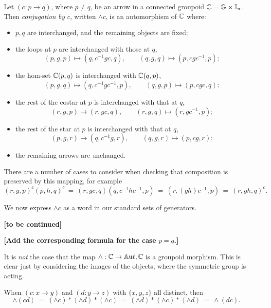 \begin{defn}
Let $(c : p \to q)$, where $p \neq q$, 
be an arrow in a connected groupoid $\mathbb{C} = \mathbb{G} \times \mathbb{I}_n$. 
Then \emph{conjugation by $c$}, written $\wedge c$, 
is an automorphism of $\mathbb{C}$ where: 
\begin{itemize}
\item
$p,q$ are interchanged, and the remaining objects are fixed; 
\item
the loops at $p$ are interchanged with those at $q$, 
$$
(p,g,p) \mapsto (q,c^{-1}gc,q), \qquad 
(q,g,q) \mapsto (p,cgc^{-1},p); 
$$
\item
the hom-set $\mathbb{C}(p,q)$ is interchanged with $\mathbb{C}(q,p)$, 
$$
(p,g,q) \mapsto (q,c^{-1}gc^{-1},p), \qquad 
(q,g,p) \mapsto (p,cgc,q);
$$
\item
the rest of the costar at $p$ is interchanged with that at $q$, 
$$
(r,g,p) \mapsto (r,gc,q), \qquad 
(r,g,q) \mapsto (r,gc^{-1},p);
$$
\item
the rest of the star at $p$ is interchanged with that at $q$, 
$$
(p,g,r) \mapsto (q,c^{-1}g,r), \qquad 
(q,g,r) \mapsto (p,cg,r);
$$
\item
the remaining arrows are unchanged. 
\end{itemize}
\end{defn}
There are a number of cases to consider when checking that composition 
is preserved by this mapping, for example 
$$
(r,g,p)^c(p,h,q)^c 
~=~ (r,gc,q)(q,c^{-1}hc^{-1},p) 
~=~ (r,(gh)c^{-1},p) 
~=~ (r,gh,q)^c. 
$$

\bigskip 
We now express $\wedge c$ as a word in our standard sets of generators. 

\medskip\noindent
{\bf [to be continued]}

\newpage\noindent
{\bf [Add the corresponding formula for the case $p=q$.]}

\bigskip
It is \emph{not} the case that the map $\wedge  : \mathbb{C} \to \mathbb{A}{\mathrm ut},\mathbb{C}$ 
is a groupoid morphism. 
This is clear just by considering the images of the objects, 
where the symmetric group is acting.

\begin{lem} 
When $(c : x \to y)$ and $(d : y \to z)$ with $\{x,y,z\}$ all distinct, then 
$$
\wedge(cd) 
~=~ (\wedge  c)*(\wedge  d)*(\wedge  c) 
~=~ (\wedge  d)*(\wedge  c)*(\wedge  d) 
~=~ \wedge(dc). 
$$
\end{lem}

